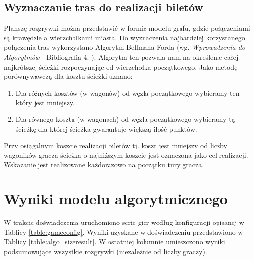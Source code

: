 \documentclass[12pt, oneside]{report}
\begin{document}
\subsection{Wyznaczanie tras do realizacji biletów}
Planszę rozgrywki można przedstawić w formie modelu grafu, gdzie połączeniami są krawędzie a wierzchołkami miasta. Do wyznaczenia najbardziej korzystanego połączenia tras wykorzystano Algorytm Bellmana-Forda (wg. \textit{Wprowadzenia do Algorytmów} - Bibliografia 4. ). Algorytm ten pozwala nam na określenie całej najkrótszej ścieżki rozpoczynając od wierzchołka początkowego. Jako metodę porównywawczą dla kosztu ścieżki uznano:
\begin{enumerate}
	\item Dla różnych kosztów (w wagonów) od węzła początkowego wybieramy ten który jest mniejszy.
	\item Dla równego kosztu (w wagonach) od węzła początkowego wybieramy tą ścieżkę dla której ścieżka gwarantuje większą ilość punktów.
\end{enumerate}
Przy osiągalnym koszcie realizacji biletów tj. koszt jest mniejszy od liczby wagoników gracza ścieżka o najniższym koszcie jest oznaczona jako cel realizacji. Wskazanie jest realizowane każdorazowo na początku tury gracza.
\section{Wyniki modelu algorytmicznego}
W trakcie doświadczenia uruchomiono serie gier według konfiguracji opisanej w Tablicy \ref{table:gameconfig}. Wyniki uzyskane w doświadczeniu przedstawiono w Tablicy \ref{table:algo_sizeresult}. W ostatniej kolumnie umieszczono wyniki podsumowujące wszystkie rozgrywki (niezależnie od liczby graczy).
\end{document}
